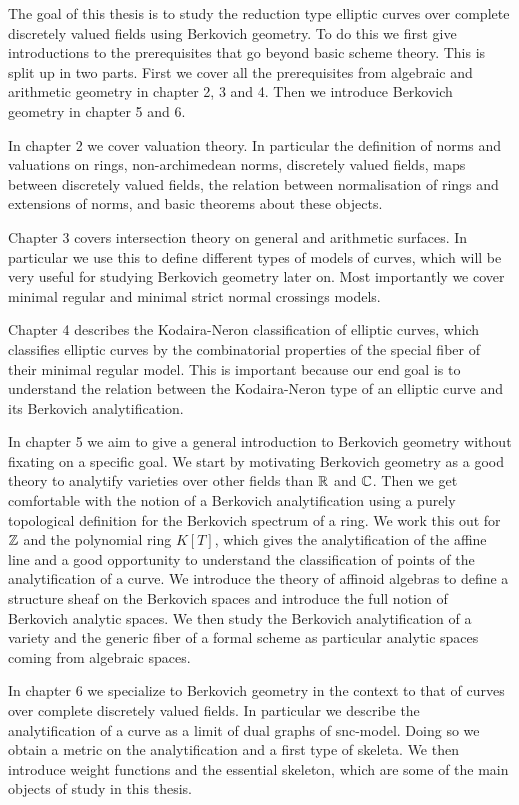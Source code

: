 The goal of this thesis is to study the reduction type elliptic curves over complete discretely valued fields using Berkovich geometry. 
To do this we first give introductions to the prerequisites that go beyond basic scheme theory.
This is split up in two parts. First we cover all the prerequisites from algebraic and arithmetic geometry in chapter 2, 3 and 4. 
Then we introduce Berkovich geometry in chapter 5 and 6. 

\medskip

In chapter 2 we cover valuation theory. In particular the definition of norms and valuations on rings, non-archimedean norms, discretely valued fields, maps between discretely valued fields, the relation between normalisation of rings and extensions of norms, and basic theorems about these objects. 

Chapter 3 covers intersection theory on general and arithmetic surfaces. 
In particular we use this to define different types of models of curves, which will be very useful for studying Berkovich geometry later on. Most importantly we cover minimal regular and minimal strict normal crossings models.

Chapter 4 describes the Kodaira-Neron classification of elliptic curves, which classifies elliptic curves by the combinatorial properties of the special fiber of their minimal regular model. 
This is important because our end goal is to understand the relation between the Kodaira-Neron type of an elliptic curve and its Berkovich analytification.

\medskip


In chapter 5 we aim to give a general introduction to Berkovich geometry without fixating on a specific goal. 
We start by motivating Berkovich geometry as a good theory to analytify varieties over other fields than $\mathbb{R}$ and $\mathbb{C}$. 
Then we get comfortable with the notion of a Berkovich analytification using a purely topological definition for the Berkovich spectrum of a ring. 
We work this out for $\mathbb{Z}$ and the polynomial ring $K[T]$, which gives the analytification of the affine line and a good opportunity to understand the classification of points of the analytification of a curve. 
We introduce the theory of affinoid algebras to define a structure sheaf on the Berkovich spaces and introduce the full notion of Berkovich analytic spaces. 
We then study the Berkovich analytification of a variety and the generic fiber of a formal scheme as particular analytic spaces coming from algebraic spaces. 

In chapter 6 we specialize to Berkovich geometry in the context to that of curves over complete discretely valued fields. 
In particular we describe the analytification of a curve as a limit of dual graphs of snc-model. 
Doing so we obtain a metric on the analytification and a first type of skeleta.
We then introduce weight functions and the essential skeleton, which are some of the main objects of study in this thesis. 

